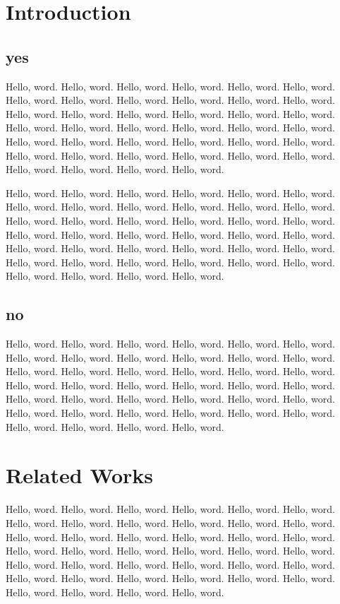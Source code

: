 \documentclass[5p]{elsarticle} %
\begin{document}
\section{Introduction}
\label{intro}

\subsection{yes}

Hello, word. Hello, word. Hello, word. Hello, word. Hello, word. Hello, word. Hello, word. Hello, word. Hello, word. Hello, word. \cite{SunCHSX21}
Hello, word. Hello, word. Hello, word. Hello, word. Hello, word. Hello, word. Hello, word. Hello, word. Hello, word. Hello, word. \cite{SunCHSX21}
Hello, word. Hello, word. Hello, word. Hello, word. Hello, word. Hello, word. Hello, word. Hello, word. Hello, word. Hello, word. \cite{SunCHSX21}
Hello, word. Hello, word. Hello, word. Hello, word. Hello, word. Hello, word. Hello, word. Hello, word. Hello, word. Hello, word. \cite{SunCHSX21}

Hello, word. Hello, word. Hello, word. Hello, word. Hello, word. Hello, word. Hello, word. Hello, word. Hello, word. Hello, word. \cite{SunCHSX21}
Hello, word. Hello, word. Hello, word. Hello, word. Hello, word. Hello, word. Hello, word. Hello, word. Hello, word. Hello, word. \cite{SunCHSX21}
Hello, word. Hello, word. Hello, word. Hello, word. Hello, word. Hello, word. Hello, word. Hello, word. Hello, word. Hello, word. \cite{SunCHSX21}
Hello, word. Hello, word. Hello, word. Hello, word. Hello, word. Hello, word. Hello, word. Hello, word. Hello, word. Hello, word. \cite{SunCHSX21}

\subsection{no}
Hello, word. Hello, word. Hello, word. Hello, word. Hello, word. Hello, word. Hello, word. Hello, word. Hello, word. Hello, word. \cite{SunCHSX21}
Hello, word. Hello, word. Hello, word. Hello, word. Hello, word. Hello, word. Hello, word. Hello, word. Hello, word. Hello, word. \cite{SunCHSX21}
Hello, word. Hello, word. Hello, word. Hello, word. Hello, word. Hello, word. Hello, word. Hello, word. Hello, word. Hello, word. \cite{SunCHSX21}
Hello, word. Hello, word. Hello, word. Hello, word. Hello, word. Hello, word. Hello, word. Hello, word. Hello, word. Hello, word. \cite{SunCHSX21}

\section{Related Works}
\label{rw}
Hello, word. Hello, word. Hello, word. Hello, word. Hello, word. Hello, word. Hello, word. Hello, word. Hello, word. Hello, word. \cite{SunCHSX21}
Hello, word. Hello, word. Hello, word. Hello, word. Hello, word. Hello, word. Hello, word. Hello, word. Hello, word. Hello, word. \cite{SunCHSX21}
Hello, word. Hello, word. Hello, word. Hello, word. Hello, word. Hello, word. Hello, word. Hello, word. Hello, word. Hello, word. \cite{SunCHSX21}
Hello, word. Hello, word. Hello, word. Hello, word. Hello, word. Hello, word. Hello, word. Hello, word. Hello, word. Hello, word. \cite{SunCHSX21}
\end{document}
